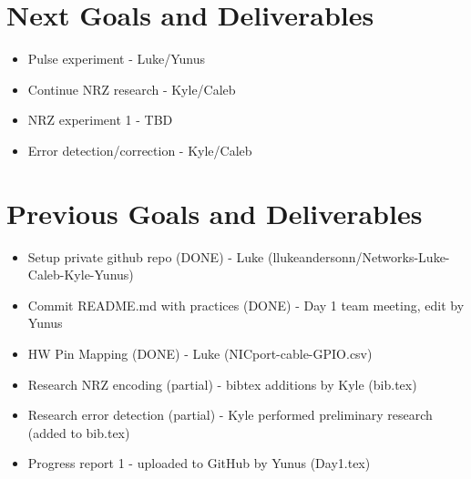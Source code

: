\documentclass{article}
\begin{document}
\section*{Next Goals and Deliverables}
\begin{itemize}
\item Pulse experiment - Luke/Yunus
\item Continue NRZ research - Kyle/Caleb
\item NRZ experiment 1 - TBD
\item Error detection/correction - Kyle/Caleb
\end{itemize}
\section*{Previous Goals and Deliverables}
\begin{itemize}
\item Setup private github repo (DONE) - Luke (llukeandersonn/Networks-Luke-Caleb-Kyle-Yunus)
\item Commit README.md with practices (DONE) - Day 1 team meeting, edit by Yunus
\item HW Pin Mapping (DONE) - Luke (NICport-cable-GPIO.csv)
\item Research NRZ encoding (partial) - bibtex additions by Kyle (bib.tex)
\item Research error detection (partial) - Kyle performed preliminary research (added to bib.tex)
\item Progress report 1 - uploaded to GitHub by Yunus (Day1.tex)
\end{itemize}
\end{document}
